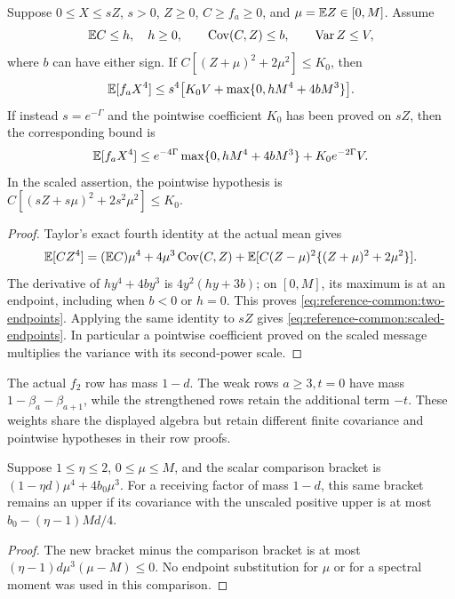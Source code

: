 \begin{lemma}
\label{lem:reference-common:fourth}
Suppose \(0\le X\le sZ\), \(s>0\), \(Z\ge0\),
\(C\ge f_a\ge0\), and \(\mu=\mathbb E Z\in[0,M]\). Assume
\[
 \mathbb E C\le h,\quad h\ge0,\qquad
 \operatorname{Cov}(C,Z)\le b,\qquad
 \operatorname{Var}Z\le V,
\]
where \(b\) can have either sign. If
\(C[(Z+\mu)^2+2\mu^2]\le K_0\), then
\begin{equation}\label{eq:reference-common:two-endpoints}
 \mathbb E[f_aX^4]\le
 s^4\bigl[K_0V+\max\{0,hM^4+4bM^3\}\bigr].
\end{equation}
If instead \(s=e^{-\Gamma}\) and the pointwise coefficient
\(K_0\) has been proved on \(sZ\), then the corresponding bound is
\begin{equation}\label{eq:reference-common:scaled-endpoints}
 \mathbb E[f_aX^4]\le
 e^{-4\Gamma}\max\{0,hM^4+4bM^3\}
       +K_0e^{-2\Gamma}V.
\end{equation}
In the scaled assertion, the pointwise hypothesis is
\(C[(sZ+s\mu)^2+2s^2\mu^2]\le K_0\).
\end{lemma}
\begin{proof}
Taylor's exact fourth identity at the actual mean gives
\[
 \mathbb E[CZ^4]=(\mathbb E C)\mu^4+4\mu^3\operatorname{Cov}(C,Z)
   +\mathbb E[C(Z-\mu)^2\{(Z+\mu)^2+2\mu^2\}].
\]
The derivative of \(hy^4+4by^3\) is
\(4y^2(hy+3b)\); on \([0,M]\), its maximum is at an
endpoint, including when \(b<0\) or \(h=0\). This proves
\eqref{eq:reference-common:two-endpoints}. Applying the same
identity to \(sZ\) gives
\eqref{eq:reference-common:scaled-endpoints}. In particular a
pointwise coefficient proved on the scaled message multiplies
the variance with its second-power scale.
\end{proof}

The actual \(f_2\) row has mass \(1-d\). The weak rows
\(a\ge3,t=0\) have mass \(1-\beta_a-\beta_{a+1}\), while
the strengthened rows retain the additional term \(-t\).
These weights share the displayed algebra but retain different
finite covariance and pointwise hypotheses in their row proofs.

\begin{lemma}
\label{lem:reference-common:mass-transfer}
Suppose \(1\le\eta\le2\), \(0\le\mu\le M\), and
the scalar comparison bracket is
\((1-\eta d)\mu^4+4b_0\mu^3\).
For a receiving factor of mass \(1-d\), this same bracket
remains an upper if its covariance with the unscaled positive
upper is at most \(b_0-(\eta-1)Md/4\).
\end{lemma}
\begin{proof}
The new bracket minus the comparison bracket is at most
\((\eta-1)d\mu^3(\mu-M)\le0\). No endpoint substitution for
\(\mu\) or for a spectral moment was used in this comparison.
\end{proof}
